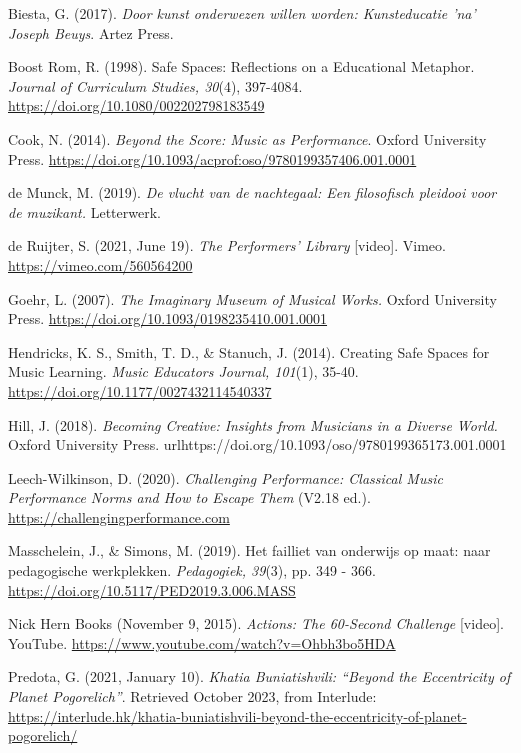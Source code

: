 \documentclass[authordate, empirical, issue]{jote-new-article}
\begin{document}
Biesta, G. (2017). \emph{Door kunst onderwezen willen worden: Kunsteducatie 'na' Joseph Beuys}. Artez Press.



Boost Rom, R. (1998). Safe Spaces: Reflections on a Educational Metaphor. \emph{Journal of Curriculum Studies, 30}(4), 397-4084. \url{https://doi.org/10.1080/002202798183549}



Cook, N. (2014). \emph{Beyond the Score: Music as Performance}. Oxford University Press. \url{https://doi.org/10.1093/acprof:oso/9780199357406.001.0001}



de Munck, M. (2019). \emph{De vlucht van de nachtegaal: Een filosofisch pleidooi voor de muzikant.} Letterwerk.



de Ruijter, S. (2021, June 19). \emph{The Performers' Library }[video]. Vimeo. \url{https://vimeo.com/560564200}



Goehr, L. (2007). \emph{The Imaginary Museum of Musical Works.} Oxford University Press. \url{https://doi.org/10.1093/0198235410.001.0001}



Hendricks, K. S., Smith, T. D., \& Stanuch, J. (2014). Creating Safe Spaces for Music Learning. \emph{Music Educators Journal, 101}(1), 35-40. \url{https://doi.org/10.1177/0027432114540337}



Hill, J. (2018). \emph{Becoming Creative: Insights from Musicians in a Diverse World.} Oxford University Press. url{https://doi.org/10.1093/oso/9780199365173.001.0001}



Leech-Wilkinson, D. (2020). \emph{Challenging Performance: Classical Music Performance Norms and How to Escape Them} (V2.18 ed.). \url{https://challengingperformance.com}



Masschelein, J., \& Simons, M. (2019). Het failliet van onderwijs op maat: naar pedagogische werkplekken. \emph{Pedagogiek, 39}(3), pp. 349 - 366. \url{https://doi.org/10.5117/PED2019.3.006.MASS}



Nick Hern Books (November 9, 2015). \emph{Actions: The 60-Second Challenge }[video]. YouTube. \url{https://www.youtube.com/watch?v=Ohbh3bo5HDA}



Predota, G. (2021, January 10). \emph{Khatia Buniatishvili: “Beyond the Eccentricity of Planet Pogorelich”}. Retrieved October 2023, from Interlude: \url{https://interlude.hk/khatia-buniatishvili-beyond-the-eccentricity-of-planet-pogorelich/}
\end{document}
